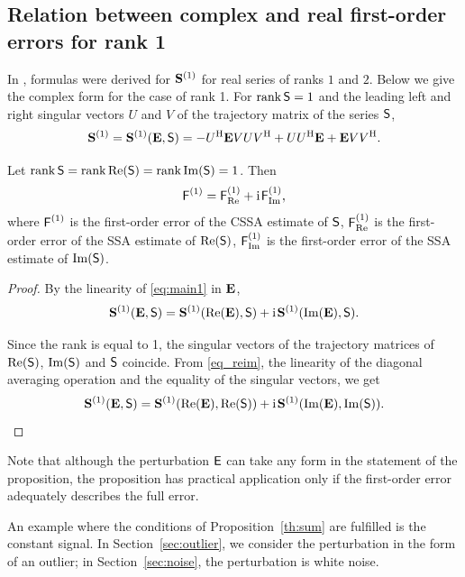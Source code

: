 \documentclass[engproc, submit, article,pdftex,moreauthors]{Definitions/mdpi}
\DeclareMathOperator\rank{rank}
\newcommand{\iu}{\mathrm{i}\mkern2mu}
\renewcommand{\Re}{\operatorname{Re}}
\renewcommand{\Im}{\operatorname{Im}}
\begin{document}
\subsection{Relation between complex and real first-order errors for rank 1}

In \cite{Nekrutkin}, formulas were derived for $\mathbf{S}^{(1)}$ for real series of ranks $1$ and $2$. Below we give the complex form for the case of rank 1.
For $\rank \tS = 1$ and the leading left and right singular vectors $U$ and $V$ of the trajectory matrix of the series $\textsf{S}$,
\begin{equation} \label{eq:main1}
	\mathbf{S}^{(1)}=\mathbf{S}^{(1)}(\mathbf{E}, \textsf{S}) = -U^{\mathrm{H}} \mathbf{E} V U V^{\mathrm{H}} + U U^{\mathrm{H}} \mathbf{E} + \mathbf{E} V V^{\mathrm{H}}.
\end{equation}


\begin{Proposition}\label{th:sum}
	Let $\rank \tS = \rank \Re(\tS) = \rank \Im(\tS) = 1$. Then $$\tF^{(1)} = \tF^{(1)}_{\Re} + \iu \tF^{(1)}_{\Im},$$
where $\textsf{F}^{(1)}$ is the first-order error of the CSSA estimate of $\textsf{S}$, $\tF^{(1)}_{\Re}$ is the first-order error of the SSA estimate of $\Re(\tS)$, $\tF^{(1)}_{\Im}$ is the first-order error of the SSA estimate of $\Im(\tS)$.
\end{Proposition}
\begin{proof}
By the linearity of \eqref{eq:main1} in $\mathbf{E}$,
\begin{equation} \label{eq_reim}
		\bfS^{(1)}(\mathbf{E}, \tS) = \bfS^{(1)}(\Re(\mathbf{E}), \tS) + \iu\bfS^{(1)}(\Im(\mathbf{E}), \tS).
\end{equation}

Since the rank is equal to 1, the singular vectors of the trajectory matrices of $\Re(\tS)$, $\Im(\tS)$ and $\textsf{S}$ coincide.
From \eqref{eq_reim}, the linearity of the diagonal averaging operation and the equality of the singular vectors, we get
\begin{equation*}
		\bfS^{(1)}(\mathbf{E}, \tS) = \bfS^{(1)}(\Re(\mathbf{E}), \Re(\tS)) + \iu\bfS^{(1)}(\Im(\mathbf{E}), \Im(\tS)).
\end{equation*}
\end{proof}

Note that although the perturbation $\textsf{E}$ can take any form in the statement of the proposition, the proposition has practical application only if the first-order error adequately describes the full error.

An example where the conditions of Proposition~\ref{th:sum} are fulfilled is the constant signal. In Section~\ref{sec:outlier}, we consider the perturbation in the form of an outlier; in Section~\ref{sec:noise}, the perturbation is white noise.
\end{document}
